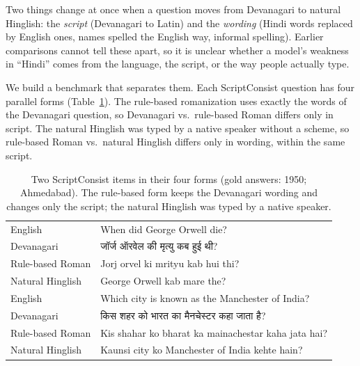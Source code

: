 \documentclass[11pt]{article}
\newcommand{\hi}[1]{{\devfont #1}}
\newcommand{\Dev}{Devanagari}
\newcommand{\Rom}{rule-based Roman}
\newcommand{\Hng}{natural Hinglish}
\newcommand{\HngC}{Natural Hinglish}
\newcommand{\RomC}{Rule-based Roman}
\begin{document}
Two things change at once when a question moves from Devanagari to natural Hinglish: the \emph{script} (Devanagari to Latin) and the \emph{wording} (Hindi words replaced by English ones, names spelled the English way, informal spelling).
Earlier comparisons cannot tell these apart, so it is unclear whether a model's weakness in ``Hindi'' comes from the language, the script, or the way people actually type.

We build a benchmark that separates them.
Each ScriptConsist question has four parallel forms (Table~\ref{tab:examples}).
The rule-based romanization uses exactly the words of the Devanagari question, so \Dev{} vs.\ \Rom{} differs only in script.
The \Hng{} was typed by a native speaker without a scheme, so \Rom{} vs.\ \Hng{} differs only in wording, within the same script.

\begin{table}[t]
\centering\small
\begin{tabularx}{\columnwidth}{@{}lX@{}}
\toprule
English & When did George Orwell die? \\
\Dev{} & \hi{जॉर्ज ऑरवेल की मृत्यु कब हुई थी}? \\
\RomC{} & Jorj orvel ki mrityu kab hui thi? \\
\HngC{} & George Orwell kab mare the? \\
\midrule
English & Which city is known as the Manchester of India? \\
\Dev{} & \hi{किस शहर को भारत का मैनचेस्टर कहा जाता है}? \\
\RomC{} & Kis shahar ko bharat ka mainachestar kaha jata hai? \\
\HngC{} & Kaunsi city ko Manchester of India kehte hain? \\
\bottomrule
\end{tabularx}
\caption{Two ScriptConsist items in their four forms (gold answers: 1950; Ahmedabad). The rule-based form keeps the Devanagari wording and changes only the script; the natural Hinglish was typed by a native speaker.}
\label{tab:examples}
\end{table}
\end{document}
